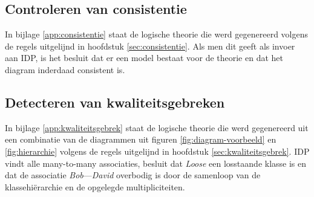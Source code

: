\subsection{Controleren van consistentie}
In bijlage \ref{app:consistentie} staat de logische theorie die werd gegenereerd volgens de regels uitgelijnd in hoofdstuk \ref{sec:consistentie}. Als men dit geeft als invoer aan IDP, is het besluit dat er een model bestaat voor de theorie en dat het diagram inderdaad consistent is.

\subsection{Detecteren van kwaliteitsgebreken}
In bijlage \ref{app:kwaliteitsgebrek} staat de logische theorie die werd gegenereerd uit een combinatie van de diagrammen uit figuren \ref{fig:diagram-voorbeeld} en \ref{fig:hierarchie} volgens de regels uitgelijnd in hoofdstuk \ref{sec:kwaliteitsgebrek}. IDP vindt alle many-to-many associaties, besluit dat \textit{Loose} een losstaande klasse is en dat de associatie \textit{Bob}---\textit{David} overbodig is door de samenloop van de klassehi\"erarchie en de opgelegde multipliciteiten.